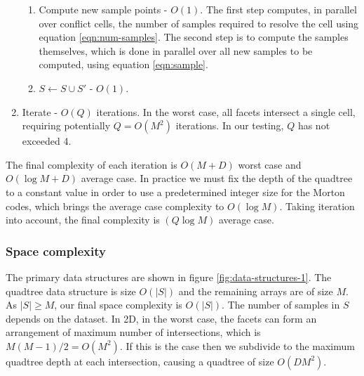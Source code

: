 \documentclass[final,3p,times,twocolumn]{elsarticle}
\begin{document}
\begin{enumerate}
  \begin{enumerate}
  \item Compute new sample points - $O(1)$. The first step computes, in parallel over conflict cells, the number of samples required to resolve the cell using equation \eqref{eqn:num-samples}. The second step is to compute the samples themselves, which is done in parallel over all new samples to be computed, using equation \eqref{eqn:sample}.
  \item $S \leftarrow S \cup S'$ - $O(1)$.
  \end{enumerate}
\item Iterate - $O(Q)$ iterations. In the worst case, all facets intersect a single cell, requiring potentially $Q=O(M^2)$ iterations. In our testing, $Q$ has not exceeded 4.
\end{enumerate}

The final complexity of each iteration is $O(M+D)$ worst case and $O(\log{M}+D)$ average case. In practice we must fix the depth of the quadtree to a constant value in order to use a predetermined integer size for the Morton codes, which brings the average case complexity to $O(\log{M})$. Taking iteration into account, the final complexity is $(Q\log{M})$ average case.

\subsubsection{Space complexity}

The primary data structures are shown in figure \ref{fig:data-structures-1}. The quadtree data structure is size $O(|S|)$ and the remaining arrays are of size $M$. As $|S| \ge M$, our final space complexity is $O(|S|)$. The number of samples in $S$ depends on the dataset. In 2D, in the worst case, the facets can form an arrangement of maximum number of intersections, which is $M(M-1)/2 = O(M^2)$. If this is the case then we subdivide to the maximum quadtree depth at each intersection, causing a quadtree of size $O(DM^2)$. %
\end{document}
